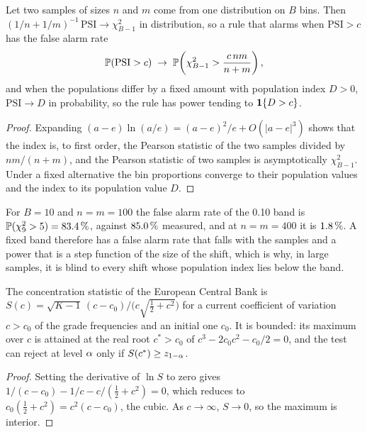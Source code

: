 \begin{proposition}
\label{prop:psi}
Let two samples of sizes $n$ and $m$ come from one distribution on $B$ bins. Then $(1/n+1/m)^{-1}\,\mathrm{PSI}\to\chi^2_{B-1}$ in distribution, so a rule that alarms when $\mathrm{PSI}>c$ has the false alarm rate
\begin{equation}
\mathbb{P}(\mathrm{PSI}>c)\;\to\;\mathbb{P}\!\left(\chi^2_{B-1}>\frac{c\,nm}{n+m}\right),
\label{eq:psi-band}
\end{equation}
and when the populations differ by a fixed amount with population index $D>0$, $\mathrm{PSI}\to D$ in probability, so the rule has power tending to $\mathbf{1}\{D>c\}$.
\end{proposition}
\begin{proof}
Expanding $(a-e)\ln(a/e)=(a-e)^2/e+O(|a-e|^3)$ shows that the index is, to first order, the Pearson statistic of the two samples divided by $nm/(n+m)$, and the Pearson statistic of two samples is asymptotically $\chi^2_{B-1}$. Under a fixed alternative the bin proportions converge to their population values and the index to its population value $D$.
\end{proof}

For $B=10$ and $n=m=100$ the false alarm rate of the 0.10 band is $\mathbb{P}(\chi^2_9>5)=83.4\,\%$, against $85.0\,\%$ measured, and at $n=m=400$ it is $1.8\,\%$.
A fixed band therefore has a false alarm rate that falls with the samples and a power that is a step function of the size of the shift, which is why, in large samples, it is blind to every shift whose population index lies below the band.

\begin{proposition}
\label{prop:hhi}
The concentration statistic of the European Central Bank is $S(c)=\sqrt{K-1}\,(c-c_0)/\big(c\sqrt{\tfrac12+c^2}\big)$ for a current coefficient of variation $c>c_0$ of the grade frequencies and an initial one $c_0$. It is bounded: its maximum over $c$ is attained at the real root $c^*>c_0$ of $c^3-2c_0c^2-c_0/2=0$, and the test can reject at level $\alpha$ only if $S(c^*)\ge z_{1-\alpha}$.
\end{proposition}
\begin{proof}
Setting the derivative of $\ln S$ to zero gives $1/(c-c_0)-1/c-c/(\tfrac12+c^2)=0$, which reduces to $c_0(\tfrac12+c^2)=c^2(c-c_0)$, the cubic. As $c\to\infty$, $S\to0$, so the maximum is interior.
\end{proof}

